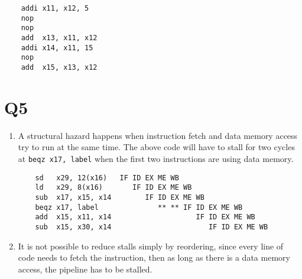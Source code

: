 \documentclass[12pt]{article}
\begin{document}
\begin{lstlisting}
	addi x11, x12, 5
	nop
	nop
	add  x13, x11, x12
	addi x14, x11, 15
	nop
	add  x15, x13, x12
\end{lstlisting}

\section*{Q5}

\begin{enumerate}
	\item
		A structural hazard happens when instruction fetch and data memory access try to run at the same time. The above code will have to stall for two cycles at \texttt{beqz x17, label} when the first two instructions are using data memory.
\begin{lstlisting}
	sd   x29, 12(x16)   IF ID EX ME WB
	ld   x29, 8(x16)       IF ID EX ME WB
	sub  x17, x15, x14        IF ID EX ME WB
	beqz x17, label              ** ** IF ID EX ME WB
	add  x15, x11, x14                    IF ID EX ME WB
	sub  x15, x30, x14                       IF ID EX ME WB
\end{lstlisting}
	\item
		It is not possible to reduce stalls simply by reordering, since every line of code needs to fetch the instruction, then as long as there is a data memory access, the pipeline has to be stalled.
\end{enumerate}

\end{document}
